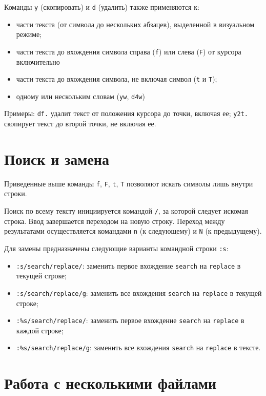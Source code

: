 \documentclass[listings]{labreport}
\begin{document}
Команды \texttt{y} (скопировать) и \texttt{d} (удалить) также применяются к:
\begin{itemize}
\item части текста (от символа до нескольких абзацев), выделенной в визуальном режиме;
\item части текста до вхождения символа справа (\texttt{f}) или слева (\texttt{F}) от курсора включительно
\item части текста до вхождения символа, не включая символ (\texttt{t} и \texttt{T});
\item одному или нескольким словам (\texttt{yw}, \texttt{d4w})
\end{itemize}

Примеры: \texttt{df.} удалит текст от положения курсора до точки, включая ее;
\texttt{y2t.} скопирует текст до второй точки, не включая ее.

\section*{Поиск и замена}

Приведенные выше команды \texttt{f}, \texttt{F}, \texttt{t}, \texttt{T}
позволяют искать символы лишь внутри строки.

Поиск по всему тексту инициируется командой \texttt{/}, за которой следует искомая строка.
Ввод завершается переходом на новую строку. Переход между результатами осуществляется
командами \texttt{n} (к следующему) и \texttt{N} (к предыдущему).

Для замены предназначены следующие варианты командной строки \texttt{:s}:
\begin{itemize}
\item \texttt{:s/search/replace/}: заменить первое вхождение \texttt{search} на \texttt{replace} в текущей строке;
\item \texttt{:s/search/replace/g}: заменить все вхождения \texttt{search} на \texttt{replace} в текущей строке;
\item \texttt{:\%s/search/replace/}: заменить первое вхождение \texttt{search} на \texttt{replace} в каждой строке;
\item \texttt{:\%s/search/replace/g}: заменить все вхождения \texttt{search} на \texttt{replace} в тексте.
\end{itemize}

\section*{Работа с несколькими файлами}
\end{document}
